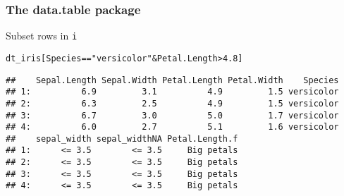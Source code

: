 \documentclass[paper=screen,mathserif]{beamer}\usepackage[]{graphicx}\usepackage[]{color}
\makeatletter
\newcommand{\hlnum}[1]{\textcolor[rgb]{0.686,0.059,0.569}{#1}}%
\newcommand{\hlstr}[1]{\textcolor[rgb]{0.192,0.494,0.8}{#1}}%
\newcommand{\hlopt}[1]{\textcolor[rgb]{0,0,0}{#1}}%
\newcommand{\hlstd}[1]{\textcolor[rgb]{0.345,0.345,0.345}{#1}}%
\newenvironment{kframe}{%
 \def\at@end@of@kframe{}%
 \ifinner\ifhmode%
  \def\at@end@of@kframe{\end{minipage}}%
  \begin{minipage}{\columnwidth}%
 \fi\fi%
 \def\FrameCommand##1{\hskip\@totalleftmargin \hskip-\fboxsep
 \colorbox{shadecolor}{##1}\hskip-\fboxsep
     \hskip-\linewidth \hskip-\@totalleftmargin \hskip\columnwidth}%
 \MakeFramed {\advance\hsize-\width
   \@totalleftmargin\z@ \linewidth\hsize
   \@setminipage}}%
 {\par\unskip\endMakeFramed%
 \at@end@of@kframe}
\newenvironment{knitrout}{}{} %
\newcommand{\ft}[1]{\frametitle{#1}}
\makeatother
\begin{document}
\begin{frame}[fragile]
  \ft{The {\bf data.table} package}
  
  Subset rows in {\tt i}

\begin{knitrout}\scriptsize
{}\color{fgcolor}\begin{kframe}
\begin{alltt}
\hlstd{dt_iris[Species} \hlopt{==} \hlstr{"versicolor"} \hlopt{&} \hlstd{Petal.Length} \hlopt{>} \hlnum{4.8}\hlstd{]}
\end{alltt}
\begin{verbatim}
##    Sepal.Length Sepal.Width Petal.Length Petal.Width    Species
## 1:          6.9         3.1          4.9         1.5 versicolor
## 2:          6.3         2.5          4.9         1.5 versicolor
## 3:          6.7         3.0          5.0         1.7 versicolor
## 4:          6.0         2.7          5.1         1.6 versicolor
##    sepal_width sepal_widthNA Petal.Length.f
## 1:      <= 3.5        <= 3.5     Big petals
## 2:      <= 3.5        <= 3.5     Big petals
## 3:      <= 3.5        <= 3.5     Big petals
## 4:      <= 3.5        <= 3.5     Big petals
\end{verbatim}
\end{kframe}
\end{knitrout}

\end{frame}
\end{document}
